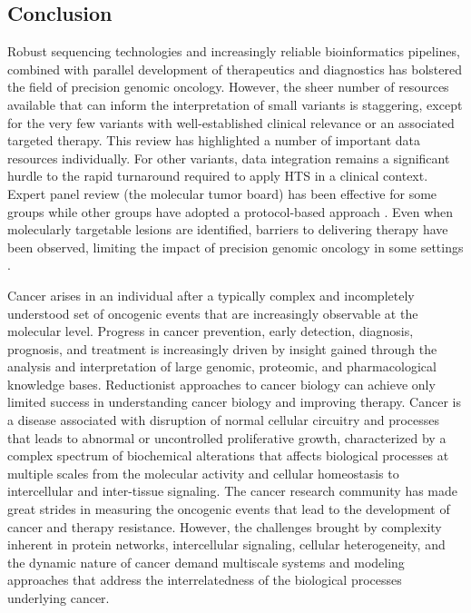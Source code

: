 \documentclass{article}
\begin{document}
\subsection{Conclusion}

Robust sequencing technologies and increasingly reliable
bioinformatics pipelines, combined with parallel development of
therapeutics and diagnostics has bolstered the field of precision
genomic oncology. However, the sheer number of resources available
that can inform the interpretation of small variants is staggering,
except for the very few variants with well-established clinical
relevance or an associated targeted therapy. This review has
highlighted a number of important data resources individually. For
other variants, data integration remains a significant hurdle to the
rapid turnaround required to apply HTS in a clinical context. Expert
panel review (the molecular tumor board) has been effective for some
groups \parencite{Knepper2017-no,Beltran2015-pz,Sohal2015-bi} while other
groups have adopted a protocol-based approach
\parencite{Ghazani2017-oo}. Even when molecularly targetable lesions are
identified, barriers to delivering therapy have been observed,
limiting the impact of precision genomic oncology in some settings
\parencite{Bryce2017-ht}.

Cancer arises in an individual after a typically complex and
incompletely understood set of oncogenic events that are increasingly
observable at the molecular level. Progress in cancer prevention,
early detection, diagnosis, prognosis, and treatment is increasingly
driven by insight gained through the analysis and interpretation of
large genomic, proteomic, and pharmacological knowledge
bases. Reductionist approaches to cancer biology can achieve only
limited success in understanding cancer biology and improving
therapy. Cancer is a disease associated with disruption of normal
cellular circuitry and processes that leads to abnormal or
uncontrolled proliferative growth, characterized by a complex spectrum
of biochemical alterations that affects biological processes at
multiple scales from the molecular activity and cellular homeostasis
to intercellular and inter-tissue signaling. The cancer research
community has made great strides in measuring the oncogenic events
that lead to the development of cancer and therapy
resistance. However, the challenges brought by complexity inherent in
protein networks, intercellular signaling, cellular heterogeneity, and
the dynamic nature of cancer demand multiscale systems and modeling
approaches that address the interrelatedness of the biological
processes underlying cancer.
\end{document}
